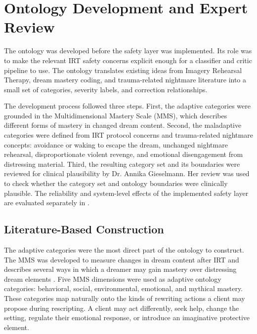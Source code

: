 \section{Ontology Development and Expert Review}

The ontology was developed before the safety layer was implemented. Its role was to make the relevant IRT safety concerns explicit enough for a classifier and critic pipeline to use. The ontology translates existing ideas from Imagery Rehearsal Therapy, dream mastery coding, and trauma-related nightmare literature into a small set of categories, severity labels, and correction relationships.

The development process followed three steps. First, the adaptive categories were grounded in the Multidimensional Mastery Scale (MMS), which describes different forms of mastery in changed dream content. Second, the maladaptive categories were defined from IRT protocol concerns and trauma-related nightmare concepts: avoidance or waking to escape the dream, unchanged nightmare rehearsal, disproportionate violent revenge, and emotional disengagement from distressing material. Third, the resulting category set and its boundaries were reviewed for clinical plausibility by Dr. Annika Gieselmann. Her review was used to check whether the category set and ontology boundaries were clinically plausible. The reliability and system-level effects of the implemented safety layer are evaluated separately in .

\subsection{Literature-Based Construction}

The adaptive categories were the most direct part of the ontology to construct. The MMS was developed to measure changes in dream content after IRT and describes several ways in which a dreamer may gain mastery over distressing dream elements \parencite{germain2004mastery}. Five MMS dimensions were used as adaptive ontology categories: behavioral, social, environmental, emotional, and mythical mastery. These categories map naturally onto the kinds of rewriting actions a client may propose during rescripting. A client may act differently, seek help, change the setting, regulate their emotional response, or introduce an imaginative protective element.

